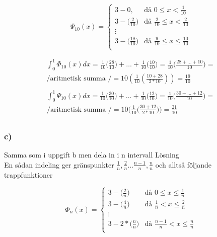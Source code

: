 \documentclass[12pt]{article}
\begin{document}
\[
\Psi_{10}(x)= \begin{cases} 
	3 - 0, & \mbox{då } 0 \leq x < \frac{1}{10}  \\
	3 - \Big(\frac{2}{10}\Big) & \mbox{då } \frac{2}{10}  \leq x < \frac{2}{10}  \\
	\vdots \\
	3 - \Big(\frac{18}{10}\Big) & \mbox{då } \frac{9}{10}  \leq x \leq \frac{10}{10}  \\
\end{cases}
\]

\[ 
\begin{split}
\int_0^1 \Phi_{10}(x)dx = \frac{1}{10}\Bigg(\frac{28}{10}\Bigg)+ \ldots  +
 					\frac{1}{10}\Bigg(\frac{10}{10}\Bigg)= 
 					\frac{1}{10} \Bigg(\frac{28 + \ldots + 10}{10}\Bigg)= \\
 					\mbox{/aritmetisk summa /} =  
 					10\left(\frac{1}{10} \left(\frac{10+28}{ 2*10}\right)\right)=\frac{19}{10}\\		
\end{split}
\]
\[
\begin{split} 
 \int_0^1 \Psi_{10}(x)dx = \frac{1}{10}\Bigg(\frac{30}{10}\Bigg)+ \ldots + 
 					\frac{1}{10}\Bigg(\frac{12}{10}\Bigg)= 
 					\frac{1}{10} \Bigg(\frac{30 + \ldots + 12}{10}\Bigg)=\\ 
 					\mbox{/aritmetisk summa /} =  
 					10\bigg(\frac{1}{10} \bigg(\frac{30+ 12}{ 2*10}\bigg)\bigg)=\frac{21}{10}\\		
\end{split}
\]

\subsubsection*{c)}

Samma som i uppgift b men dela in i n intervall
Lösning \\

En sådan indeling ger gränspunkter $\frac{1}{n}, \frac{2}{n} \ldots \frac{n-1}{n}, \frac{n}{n}$
och alltså följande trappfunktioner

\[
\Phi_{n} (x)= \begin{cases} 
	3 - \Big(\frac{2}{n}\Big) & \mbox{då }  0 \leq x \leq \frac{1}{n}  \\
	3 - \Big(\frac{4}{n}\Big) & \mbox{då } \frac{1}{n} < x \leq \frac{2}{n}  \\
	\vdots \\
	3 - 2 *\Big(\frac{n}{n}\Big) & \mbox{då } \frac{n-1}{n} < x \leq \frac{n}{n}  \\
\end{cases}
\]
\end{document}
